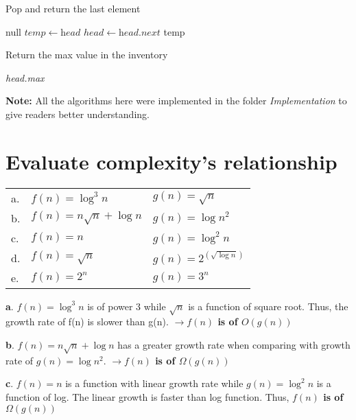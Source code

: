 \documentclass[16pt, letterpaper]{article}
\begin{document}
\begin{algorithm} [H]
\caption{Pop and return the last element}
\begin{algorithmic}[1]
    \State \Return null
    \Else 
    \State $temp \gets \textit{head}$
    \State $head \gets \textit{head.next}$
    \State \Return temp
    \EndIf
    \EndProcedure
\end{algorithmic}
\end{algorithm}

\begin{algorithm}[H]
\caption{Return the max value in the inventory}
\begin{algorithmic}[1]
       
    \Else 
    \State \Return \textit{head.max}
    \EndIf
\EndProcedure
\end{algorithmic}
\end{algorithm}

\textbf{Note:} All the algorithms here were implemented in the folder \textit{Implementation} to give readers better understanding.

\section{Evaluate complexity's relationship}
\begin{tabular}{l l l}
a. & $f(n) = {\log^3 n}$ & $g(n) = \sqrt n$ \\
b. & $f(n) = n\sqrt n + \log n$ & $g(n) = \log n^2 $ \\
c. & $f(n) = n $ & $g(n) = \log^2 n$ \\
d. & $f(n) = \sqrt n $ & $g(n) = 2^(\sqrt {\log n})$ \\
e. & $f(n) = 2^n $ & $g(n) = 3^n$
\end{tabular}

\textbf{a}. $f(n) = {\log^3 n}$ is of power 3 while $\sqrt n$ is a function of square root. Thus, the growth rate of f(n) is slower than g(n). \textbf{$\longrightarrow f(n)$ is of $O(g(n))$}

\textbf{b}. $f(n) = n\sqrt n + \log n$  has a greater growth rate when comparing with growth rate of $g(n) = \log n^2 $. \textbf{$\longrightarrow f(n)$ is of $\Omega(g(n))$}

\textbf{c}. $f(n) = n $ is a function with linear growth rate while $g(n) = \log^2 n$ is a function of log. The linear growth is faster than log function. Thus, \textbf{$f(n)$ is of $\Omega(g(n))$} 
\end{document}
